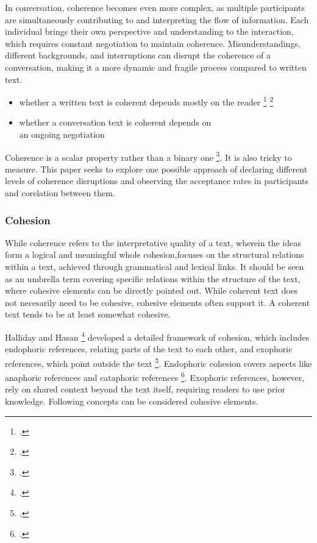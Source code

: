 \documentclass[12pt]{report}
\begin{document}
{\par
    In conversation, coherence becomes even more complex,
    as multiple participants are simultaneously contributing to and interpreting the flow of information.
    Each individual brings their own perspective and understanding to the interaction,
    which requires constant negotiation to maintain coherence.
    Misunderstandings, different backgrounds, and interruptions
    can disrupt the coherence of a conversation,
    making it a more dynamic and fragile process compared to written text.

\begin{itemize}
\item
whether a written text is coherent depends mostly on the reader \footcite{bublitz1999disturbed} \footcite{Roberts01101993}
\item
whether a conversation text is coherent depends on\\ an ongoing negotiation
\end{itemize}

\par
    Coherence is a scalar property rather than a binary one \footcite{givón2020coherence}.
    It is also tricky to measure.
    This paper seeks to explore one possible approach of
    declaring different levels of coherence disruptions
    and observing the acceptance rates in participants
    and corelation between them.

\subsubsection{Cohesion}
\par
    While coherence refers to the interpretative quality of a text,
    wherein the ideas form a logical and meaningful whole
    cohesion,focuses on the structural relations
    within a text, achieved through grammatical and lexical links.
    It should be seen as an umbrella term
    covering specific relations within
    the structure of the text,
    where cohesive elements can be directly pointed out.
    While coherent text does not necesarily need to be cohesive,
    cohesive elements often support it.
    A coherent text tends to be at least somewhat cohesive.

\par
    Halliday and Hasan \footcite{Halliday76cohesion} developed
    a detailed framework of cohesion, which includes
    endophoric references,
    relating parts of the text to each other, and
    exophoric references, which point outside the text \footcite[p.~31]{Halliday76cohesion}.
    Endophoric cohesion covers aspects
    like anaphoric references and cataphoric references \footcite{hajicovasgall2003, loaiciga-etal-2022-anaphoric}.
    Exophoric references, however, rely on shared context beyond the text itself,
    requiring readers to use prior knowledge.
    Following concepts can be considered cohesive elements.

}
\end{document}
